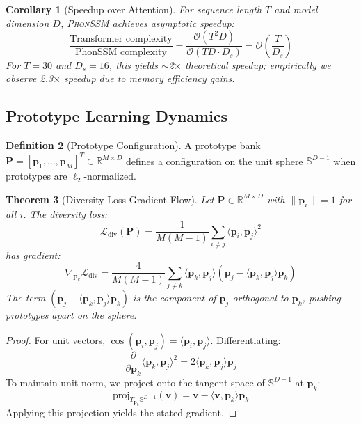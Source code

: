 \documentclass{article}
\newtheorem{theorem}{Theorem}[section]
\newtheorem{corollary}[theorem]{Corollary}
\theoremstyle{definition}
\newtheorem{definition}[theorem]{Definition}
\theoremstyle{remark}
\newcommand{\phonssm}{\textsc{PhonSSM}}
\begin{document}
\begin{corollary}[Speedup over Attention]
For sequence length $T$ and model dimension $D$, \phonssm{} achieves asymptotic speedup:
\begin{equation}
\frac{\text{Transformer complexity}}{\text{PhonSSM complexity}} = \frac{\mathcal{O}(T^2 D)}{\mathcal{O}(TD \cdot D_s)} = \mathcal{O}\left(\frac{T}{D_s}\right)
\end{equation}
For $T=30$ and $D_s=16$, this yields $\sim$2$\times$ theoretical speedup; empirically we observe 2.3$\times$ speedup due to memory efficiency gains.
\end{corollary}

\subsection{Prototype Learning Dynamics}

\begin{definition}[Prototype Configuration]
A prototype bank $\mathbf{P} = [\mathbf{p}_1, \ldots, \mathbf{p}_M]^T \in \mathbb{R}^{M \times D}$ defines a configuration on the unit sphere $\mathbb{S}^{D-1}$ when prototypes are $\ell_2$-normalized.
\end{definition}

\begin{theorem}[Diversity Loss Gradient Flow]
\label{thm:diversity}
Let $\mathbf{P} \in \mathbb{R}^{M \times D}$ with $\|\mathbf{p}_i\| = 1$ for all $i$. The diversity loss:
\begin{equation}
\mathcal{L}_{\text{div}}(\mathbf{P}) = \frac{1}{M(M-1)} \sum_{i \neq j} \langle \mathbf{p}_i, \mathbf{p}_j \rangle^2
\end{equation}
has gradient:
\begin{equation}
\nabla_{\mathbf{p}_k} \mathcal{L}_{\text{div}} = \frac{4}{M(M-1)} \sum_{j \neq k} \langle \mathbf{p}_k, \mathbf{p}_j \rangle \left( \mathbf{p}_j - \langle \mathbf{p}_k, \mathbf{p}_j \rangle \mathbf{p}_k \right)
\end{equation}
The term $(\mathbf{p}_j - \langle \mathbf{p}_k, \mathbf{p}_j \rangle \mathbf{p}_k)$ is the component of $\mathbf{p}_j$ orthogonal to $\mathbf{p}_k$, pushing prototypes apart on the sphere.
\end{theorem}

\begin{proof}
For unit vectors, $\cos(\mathbf{p}_i, \mathbf{p}_j) = \langle \mathbf{p}_i, \mathbf{p}_j \rangle$. Differentiating:
\begin{equation}
\frac{\partial}{\partial \mathbf{p}_k} \langle \mathbf{p}_k, \mathbf{p}_j \rangle^2 = 2 \langle \mathbf{p}_k, \mathbf{p}_j \rangle \mathbf{p}_j
\end{equation}
To maintain unit norm, we project onto the tangent space of $\mathbb{S}^{D-1}$ at $\mathbf{p}_k$:
\begin{equation}
\text{proj}_{T_{\mathbf{p}_k}\mathbb{S}^{D-1}}(\mathbf{v}) = \mathbf{v} - \langle \mathbf{v}, \mathbf{p}_k \rangle \mathbf{p}_k
\end{equation}
Applying this projection yields the stated gradient.
\end{proof}
\end{document}
